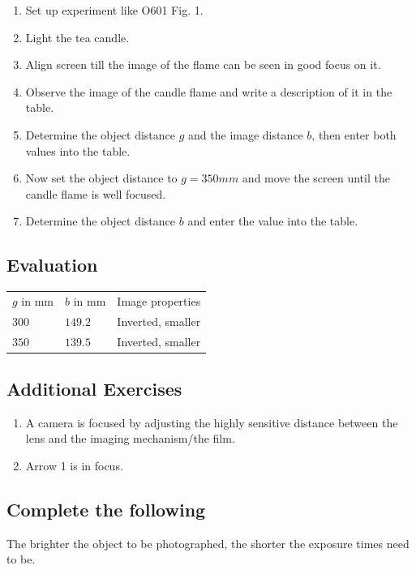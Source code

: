 \documentclass[12pt]{article}
\begin{document}
\begin{enumerate}
\item Set up experiment like O601 Fig. 1.
\item Light the tea candle.
\item Align screen till the image of the flame can be seen in good focus on it.
\item Observe the image of the candle flame and write a description of it in the table.
\item Determine the object distance $g$ and the image distance $b$, then enter both values into the table.
\item Now set the object distance to $g=350mm$ and move the screen until the candle flame is well focused.
\item Determine the object distance $b$ and enter the value into the table.
\end{enumerate}

\subsection*{Evaluation}

\begin{table}[]
\begin{tabular}{lll}
$g$ in mm & $b$ in mm & Image properties \\
 $300$ & $149.2$  & Inverted, smaller  \\
$350$ & $139.5$ & Inverted, smaller
\end{tabular}
\end{table}

\subsection*{Additional Exercises}

\begin{enumerate}
\item A camera is focused by adjusting the highly sensitive distance between the lens and the imaging mechanism/the film.
\item Arrow 1 is in focus.
\end{enumerate}

\subsection*{Complete the following}

The brighter the object to be photographed, the shorter the exposure times need to be. 
\end{document}
